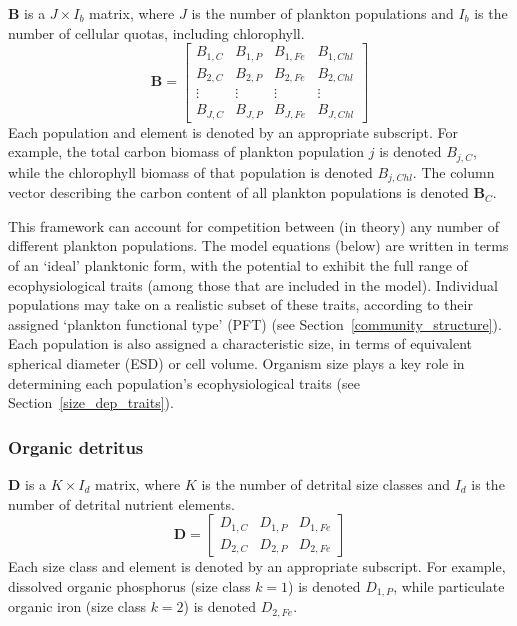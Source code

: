 \documentclass[gmd, manuscript]{copernicus}
\begin{document}
$\mathbf{B}$ is a $J\times I_b$ matrix, where $J$ is the number of plankton populations and $I_b$ is the number of cellular quotas, including chlorophyll.
%
\begin{equation}
\mathbf{B}=\left[\begin{array}{cccccc} B_{1,C}		& B_{1,P}		& B_{1,Fe}	& B_{1,Chl} 	\\
 	B_{2,C}		& B_{2,P}		& B_{2,Fe}	& B_{2,Chl} 	\\
 	\vdots		& \vdots		& \vdots 		& \vdots 		\\
 	B_{J,C}		& B_{J,P}		& B_{J,Fe}	& B_{J,Chl} 	\end{array}\right]
\end{equation}
%
Each population and element is denoted by an appropriate subscript. For example, the total carbon biomass of plankton population $j$ is denoted $B_{j,C}$, while the chlorophyll biomass of that population is denoted $B_{j,Chl}$. The column vector describing the carbon content of all plankton populations is denoted $\mathbf{B}_{C}$.

This framework can account for competition between (in theory) any number of different plankton populations. The model equations (below) are written in terms of an `ideal' planktonic form, with the potential to exhibit the full range of ecophysiological traits (among those that are included in the model). Individual populations may take on a realistic subset of these traits, according to their assigned `plankton functional type' (PFT) (see Section~\ref{community_structure}). Each population is also assigned a characteristic size, in terms of equivalent spherical diameter (ESD) or cell volume. Organism size plays a key role in determining each population's ecophysiological traits (see Section~\ref{size_dep_traits}).

\subsubsection{Organic detritus}

$\mathbf{D}$ is a $K\times I_d$ matrix, where $K$ is the number of detrital size classes and $I_d$ is the number of detrital nutrient elements.
%
\begin{equation}
\mathbf{D}=\left[\begin{array}{ccc}	D_{1,C}	& D_{1,P}	& D_{1,Fe} \\
 	D_{2,C} 	& D_{2,P} 	& D_{2,Fe} \end{array}\right]
\end{equation}
%
Each size class and element is denoted by an appropriate subscript. For example, dissolved organic phosphorus (size class $k=1$) is denoted $D_{1,P}$, while particulate organic iron (size class $k=2$) is denoted $D_{2,Fe}$.
\end{document}
